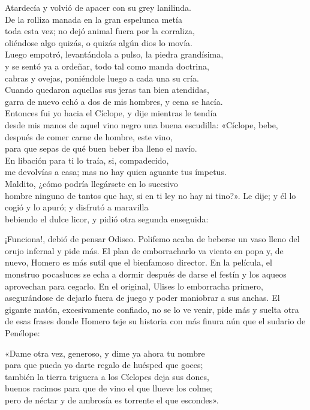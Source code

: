 \begin{versocita}
Atardecía y volvió de apacer con su grey lanilinda.\\
De la rolliza manada en la gran espelunca metía\\
toda esta vez; no dejó animal fuera por la corraliza,\\
oliéndose algo quizás, o quizás algún dios lo movía.\\
Luego empotró, levantándola a pulso, la piedra grandísima,\\
y se sentó ya a ordeñar, todo tal como manda doctrina,\\
cabras y ovejas, poniéndole luego a cada una su cría.\\
Cuando quedaron aquellas sus jeras tan bien atendidas,\\
garra de nuevo echó a dos de mis hombres, y cena se hacía.\\
Entonces fui yo hacia el Cíclope, y dije mientras le tendía\\
desde mis manos de aquel vino negro una buena escudilla:
\stanzabreak
«Cíclope, bebe, después de comer carne de hombre, este vino,\\
para que sepas de qué buen beber iba lleno el navío.\\
En libación para ti lo traía, si, compadecido,\\
me devolvías a casa; mas no hay quien aguante tus ímpetus.\\
Maldito, ¿cómo podría llegársete en lo sucesivo\\
hombre ninguno de tantos que hay, si en ti ley no hay ni tino?».
\stanzabreak
Le dije; y él lo cogió y lo apuró; y disfrutó a maravilla\\
bebiendo el dulce licor, y pidió otra segunda enseguida:
\end{versocita}

¡Funciona!, debió de pensar Odiseo. Polifemo acaba de beberse un vaso lleno del orujo infernal y pide más. El plan de emborracharlo va viento en popa y, de nuevo, Homero es más sutil que el bienfamoso director. En la película, el monstruo pocasluces se echa a dormir después de darse el festín y los aqueos aprovechan para cegarlo. En el original, Ulises lo emborracha primero, asegurándose de dejarlo fuera de juego y poder maniobrar a sus anchas. El gigante matón, excesivamente confiado, no se lo ve venir, pide más y suelta otra de esas frases donde Homero teje su historia con más finura aún que el sudario de Penélope:

\begin{versocita}
«Dame otra vez, generoso, y dime ya ahora tu nombre\\
para que pueda yo darte regalo de huésped que goces;\\
también la tierra triguera a los Cíclopes deja sus dones,\\
buenos racimos para que de vino el que llueve los colme;\\
pero de néctar y de ambrosía es torrente el que escondes».
\end{versocita}

